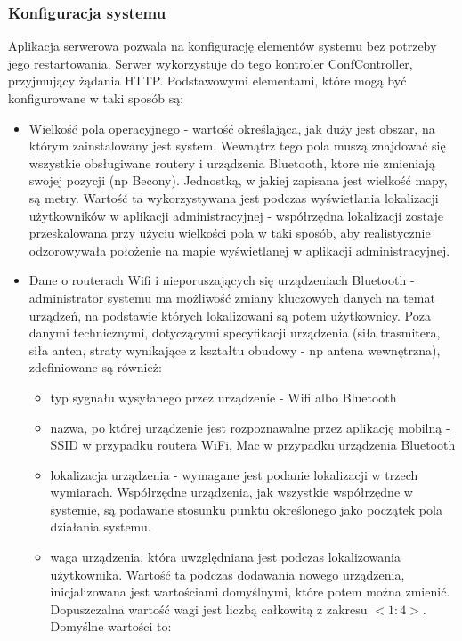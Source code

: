 \documentclass{article}
\begin{document}
		\subsubsection{Konfiguracja systemu}
		Aplikacja serwerowa pozwala na konfigurację elementów systemu bez potrzeby jego restartowania. Serwer wykorzystuje do tego kontroler ConfController, przyjmujący żądania HTTP. Podstawowymi elementami, które mogą być konfigurowane w taki sposób są:
		\begin{itemize}
			\item Wielkość pola operacyjnego - wartość określająca, jak duży jest obszar, na którym zainstalowany jest system. Wewnątrz tego pola muszą znajdować się wszystkie obsługiwane routery i urządzenia Bluetooth, ktore nie zmieniają swojej pozycji (np Becony). Jednostką, w jakiej zapisana jest wielkość mapy, są metry. Wartość ta wykorzystywana jest podczas wyświetlania lokalizacji użytkowników w aplikacji administracyjnej - współrzędna lokalizacji zostaje przeskalowana przy użyciu wielkości pola w taki sposób, aby realistycznie odzorowywała położenie na mapie wyświetlanej w aplikacji administracyjnej.
			\item Dane o routerach Wifi i nieporuszających się urządzeniach Bluetooth - administrator systemu ma możliwość zmiany kluczowych danych na temat urządzeń, na podstawie których lokalizowani są potem użytkownicy. Poza danymi technicznymi, dotyczącymi specyfikacji urządzenia (siła trasmitera, siła anten, straty wynikające z kształtu obudowy - np antena wewnętrzna), zdefiniowane są również:
			\begin{itemize}
				\item typ sygnału wysyłanego przez urządzenie - Wifi albo Bluetooth
				\item nazwa, po której urządzenie jest rozpoznawalne przez aplikację mobilną - SSID w przypadku routera WiFi, Mac w przypadku urządzenia Bluetooth
				\item lokalizacja urządzenia - wymagane jest podanie lokalizacji w trzech wymiarach. Współrzędne urządzenia, jak wszystkie współrzędne w systemie, są podawane stosunku punktu określonego jako początek pola działania systemu.
				\item waga urządzenia, która uwzględniana jest podczas lokalizowania użytkownika. Wartość ta podczas dodawania nowego urządzenia, inicjalizowana jest wartościami domyślnymi, które potem można zmienić. Dopuszczalna wartość wagi jest liczbą całkowitą z zakresu $<1:4>$. Domyślne wartości to:
				\begin{itemize}

\end{itemize}
\end{itemize}
\end{itemize}
\end{document}
